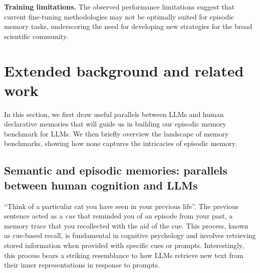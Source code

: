 \documentclass{article}
\begin{document}
\textbf{Training limitations.} The observed performance limitations suggest that current fine-tuning methodologies may not be optimally suited for episodic memory tasks,  underscoring the need  for developing new strategies for the broad scientific community.







\newpage
\appendix

\section{Extended background and related work}\label{appx:related}
In this section, we first draw useful parallels between LLMs and human declarative memories that will guide us in building our episodic memory benchmark for LLMs.  We then briefly overview the landscape of memory benchmarks, showing how none captures the intricacies of episodic memory.

\subsection{Semantic and episodic memories: parallels between human cognition and LLMs}\label{appx:parallels}
``Think of a particular cat you have seen in your previous life''. The previous sentence acted as a \textit{cue} that reminded you of an episode from your past, a memory trace that you recollected with the aid of the cue. This process, known as cue-based recall, is fundamental in cognitive psychology and involves retrieving stored information when provided with specific cues or prompts. Interestingly, this process bears a striking resemblance to how LLMs retrieve new text from their inner representations in response to prompts.
\end{document}
